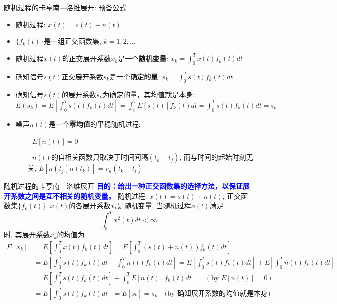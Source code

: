 \begin{frame}{随机过程的卡亨南---洛维展开: 预备公式}
\begin{itemize}
\item 随机过程: $x(t)=s(t)+n(t)$
\item $\{f_k(t)\}$是一组正交函数集, $k=1,2,\dots$
\item 随机过程$x(t)的$正交展开系数$x_k$是一个\textbf{随机变量}: $x_k=\int_{0}^{T}x(t)f_k(t)dt$
\item 确知信号$s(t)$正交展开系数$s_k$是一个\textbf{确定的量}: $s_k=\int_{0}^{T}s(t)f_k(t)dt$
\item 确知信号$s(t)$的展开系数$s_k$为确定的量，其均值就是本身: $E(s_k)=E\left[\int_{0}^{T}s(t)f_k(t)dt\right]=\int_{0}^{T}E[s(t)]f_k(t)dt=\int_{0}^{T}s(t)f_k(t)dt=s_k$
\item 噪声$n(t)$是一个\textbf{零均值}的平稳随机过程:
\begin{itemize}
\item[-] $E[n(t)]=0$
\item[-]  $n(t)$的自相关函数只取决于时间间隔$(t_k-t_j)$, 而与时间的起始时刻无关, $E[n(t_j)n(t_k)]=r_n(t_k-t_j)$
\end{itemize}
\end{itemize}
\end{frame}

\begin{frame}[shrink]{随机过程的卡亨南---洛维展开}
\textbf{\textcolor{blue}{目的：给出一种正交函数集的选择方法，以保证展开系数之间是互不相关的随机变量。}}
随机过程: $x(t)=s(t)+n(t)$, 正交函数集$\{f_k(t)\}$, $x(t)$的各展开系数$x_k$是随机变量, 当随机过程$x(t)$满足
\[\int_{0}^{T}x^2(t)dt<\infty \]
时, 其展开系数$x_k$的均值为
\begin{align*}
E[x_k]&=E\left[\int_{0}^{T}x(t)f_k(t)dt\right]=E\left[\int_{0}^{T}\left(s(t)+n(t)\right)f_k(t)dt\right]\\
&=E\left[\int_{0}^{T}s(t)f_k(t)dt+\int_{0}^{T}n(t)f_k(t)dt\right]=E\left[\int_{0}^{T}s(t)f_k(t)dt\right]+E\left[\int_{0}^{T}n(t)f_k(t)dt\right]\\
&=E\left[\int_{0}^{T}s(t)f_k(t)dt\right]+\int_{0}^{T}E[n(t)]f_k(t)dt \qquad  (\text{by }E[n(t)]=0)\\
&=E\left[\int_{0}^{T}s(t)f_k(t)dt\right]=E[s_k] = s_k\quad \text{(by 确知展开系数的均值就是本身)}
\end{align*}
\end{frame}

